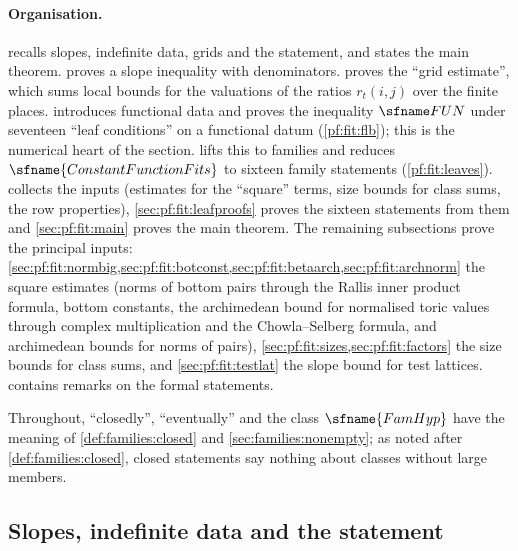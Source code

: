 \paragraph{Organisation.}
 recalls slopes, indefinite data, grids and the statement, and states the main theorem.
 proves a slope inequality with denominators.  proves the
``grid estimate'', which sums local bounds for the valuations of the ratios $r_t(i,j)$ over the finite places.
 introduces functional data and proves the inequality $\fitFUN$ under seventeen ``leaf
conditions'' on a functional datum (\cref{pf:fit:flb}); this is the numerical heart of the section.
 lifts this to families and reduces $\sfname{ConstantFunctionFits}$ to sixteen family
statements (\cref{pf:fit:leaves}).  collects the inputs (estimates for the ``square'' terms,
size bounds for class sums, the row properties), \cref{sec:pf:fit:leafproofs} proves the sixteen statements from them and
\cref{sec:pf:fit:main} proves the main theorem. The remaining subsections prove the principal inputs:
\cref{sec:pf:fit:normbig,sec:pf:fit:botconst,sec:pf:fit:betaarch,sec:pf:fit:archnorm} the square estimates (norms of bottom
pairs through the Rallis inner product formula, bottom constants, the archimedean bound for normalised toric values through
complex multiplication and the Chowla--Selberg formula, and archimedean bounds for norms of pairs),
\cref{sec:pf:fit:sizes,sec:pf:fit:factors} the size bounds for class sums, and \cref{sec:pf:fit:testlat} the slope bound for
test lattices.  contains remarks on the formal statements.

Throughout, ``closedly'', ``eventually'' and the class $\sfname{FamHyp}$ have the meaning of
\cref{def:families:closed} and \cref{sec:families:nonempty}; as noted after \cref{def:families:closed}, closed
statements say nothing about classes without large members.

\subsection{Slopes, indefinite data and the statement}\label{sec:pf:fit:setting}

